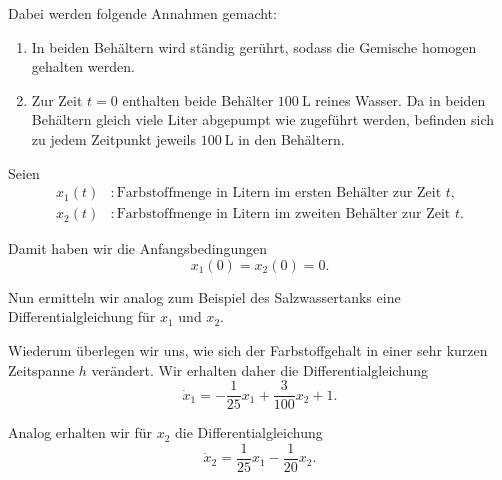 


Dabei werden folgende Annahmen gemacht:

\begin{enumerate}
    \item In beiden Behältern wird ständig gerührt, sodass die
          Gemische homogen gehalten werden.

    \item Zur Zeit \(t=0\) enthalten beide Behälter
          \(\SI{100}{\liter}\) reines Wasser.
          Da in beiden Behältern gleich viele Liter abgepumpt
          wie zugeführt werden, befinden sich zu jedem
          Zeitpunkt jeweils \(\SI{100}{\liter}\) in den Behältern.
\end{enumerate}

Seien
\begin{align*}
    x_1(t) & : \text{Farbstoffmenge in Litern im ersten Behälter
                   zur Zeit } t,  \\
    x_2(t) & : \text{Farbstoffmenge in Litern im zweiten Behälter
                   zur Zeit } t.
\end{align*}

Damit haben wir die Anfangsbedingungen
\[
    x_1(0)=x_2(0)=0.
\]

Nun ermitteln wir analog zum Beispiel des Salzwassertanks
eine Differentialgleichung für \(x_1\) und \(x_2\).

Wiederum überlegen wir uns, wie sich der Farbstoffgehalt
in einer sehr kurzen Zeitspanne \(h\) verändert.
\clearpage
{}
Wir erhalten daher die Differentialgleichung
\[
    \dot{x}_1
    = -\frac{1}{25}x_1
    + \frac{3}{100}x_2
    + 1.
\]

Analog erhalten wir für \(x_2\) die Differentialgleichung
\[
    \dot{x}_2
    = \frac{1}{25}x_1
    - \frac{1}{20}x_2.
\]

